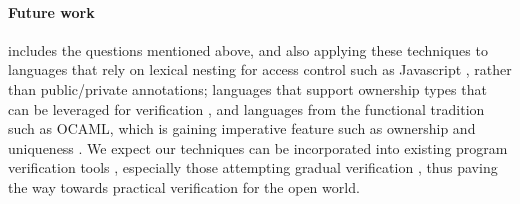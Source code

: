 \paragraph{Future work} includes the questions mentioned above, and also  applying these techniques to
languages that rely on lexical nesting for access
control such as Javascript \cite{ooToSecurity},
rather than public/private annotations;
languages that support ownership types that can be leveraged for
verification
\cite{leveragingRust-oopsla2019,RustHornBelt-pldi2022,verus-oopsla2023},
and languages from the
functional tradition such as OCAML, which is gaining imperative
feature such as ownership and uniqueness \cite{funk-ownership-oopsla2024,ocaml-ownership-icfp2024}. 
%
%
We expect our techniques can be incorporated into existing program
verification tools \cite{Cok2022}, especially those attempting
gradual verification \cite{gradual-verification-popl2024},
thus paving the way towards practical verification for
the open world.


 



